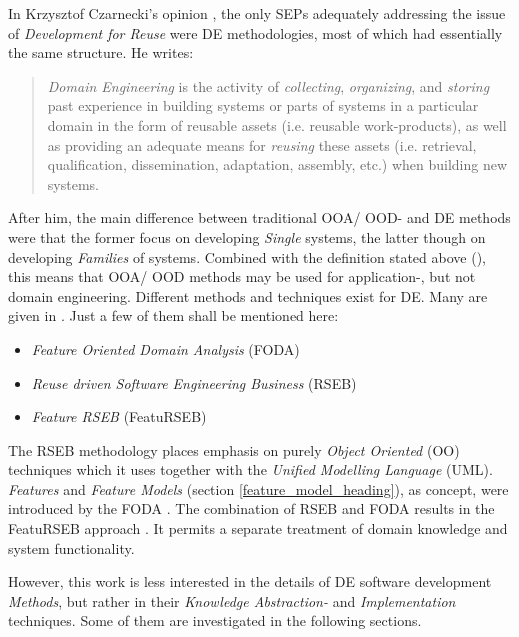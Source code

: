 In Krzysztof Czarnecki's opinion \cite{czarnecki}, the only SEPs adequately
addressing the issue of \emph{Development for Reuse} were DE methodologies,
most of which had essentially the same structure. He writes:

\begin{quote}
    \emph{Domain Engineering} is the activity of \emph{collecting},
    \emph{organizing}, and \emph{storing} past experience in building systems or
    parts of systems in a particular domain in the form of reusable assets (i.e.
    reusable work-products), as well as providing an adequate means for
    \emph{reusing} these assets (i.e. retrieval, qualification, dissemination,
    adaptation, assembly, etc.) when building new systems.
\end{quote}

After him, the main difference between traditional OOA/ OOD- and DE methods
were that the former focus on developing \emph{Single} systems, the latter
though on developing \emph{Families} of systems. Combined with the definition
stated above (\cite{domainengg}), this means that OOA/ OOD methods may be used
for application-, but not domain engineering. Different methods and techniques
exist for DE. Many are given in \cite{wartik, arrango, fere}. Just a few of
them shall be mentioned here:

\begin{itemize}
    \item{\emph{Feature Oriented Domain Analysis} (FODA)}
    \item{\emph{Reuse driven Software Engineering Business} (RSEB)}
    \item{\emph{Feature RSEB} (FeatuRSEB)}
\end{itemize}

The RSEB methodology \cite{jacobson1997} places emphasis on purely
\emph{Object Oriented} (OO) techniques which it uses together with the
\emph{Unified Modelling Language} (UML). \emph{Features} and \emph{Feature Models}
(section \ref{feature_model_heading}), as concept, were introduced by the FODA
\cite{foda}. The combination of RSEB and FODA results in the FeatuRSEB approach
\cite{griss}. It permits a separate treatment of domain knowledge and system
functionality.

However, this work is less interested in the details of DE software development
\emph{Methods}, but rather in their \emph{Knowledge Abstraction-} and
\emph{Implementation} techniques. Some of them are investigated in the
following sections.








